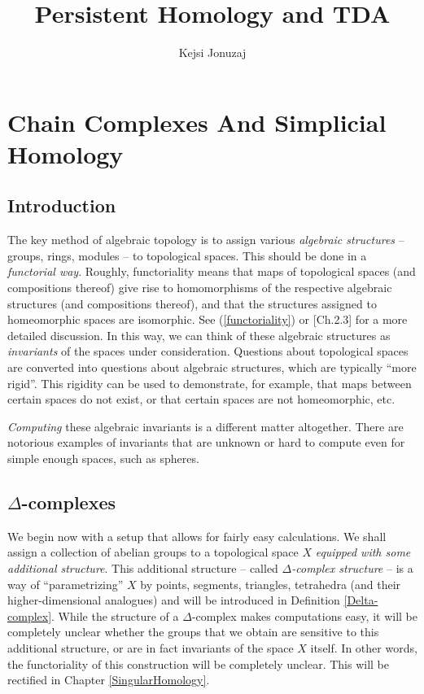 \documentclass[11pt,a4paper]{report}
\author{Kejsi Jonuzaj}
\title{Persistent Homology and TDA}
\begin{document}
\maketitle
\setcounter{tocdepth}{1}
\tableofcontents

     
      \chapter{Chain Complexes And Simplicial Homology}
      \label{chapter1}

      \section{Introduction} 
      
	      
	      The key method of  algebraic topology is to assign various \emph{algebraic structures} -- groups, rings, modules --  to topological spaces.
	      This should be done in a
	      \emph{ functorial way}. 
	      Roughly, functoriality means that maps of topological spaces (and compositions thereof) give rise to 
	      homomorphisms of the respective algebraic structures
	      (and compositions thereof), and that the structures assigned to homeomorphic spaces are isomorphic. 
	      See (\ref{functoriality}) or \cite{hatcher}[Ch.2.3] for a more detailed discussion.
	      In this way,
	      we can think of these algebraic structures as \emph{invariants} of the spaces under consideration.
	      Questions about topological
	      spaces  are converted into questions about algebraic structures, which  are typically ``more rigid''. This rigidity can
	      be used to demonstrate, for example,  that maps between certain spaces do not exist, or that certain spaces are not homeomorphic, etc. 
	      
	      \emph{Computing} these algebraic invariants is a different matter altogether. There are notorious examples of invariants that are unknown or
	      hard to compute even for simple enough spaces, such as spheres.
	      
	      \section{$\Delta$-complexes}
	      
	      We begin now with a setup that allows for fairly easy calculations. We shall
	      assign a collection of abelian groups to a topological space $X$ \emph{equipped with some additional structure}.
	      This additional structure -- called \emph{$\Delta$-complex structure} -- is a way of ``parametrizing'' $X$ by points, 
	      segments, triangles, tetrahedra (and their higher-dimensional analogues) and will be introduced in Definition \ref{Delta-complex}.
	      While the structure of a $\Delta$-complex makes computations easy, it will be completely unclear whether the groups that we obtain are sensitive
	      to this additional structure, or are in fact invariants  of the space $X$ itself. In other words, the functoriality of this construction will be completely unclear.
	      This will be rectified in Chapter \ref{SingularHomology}.
	      
\end{document}
